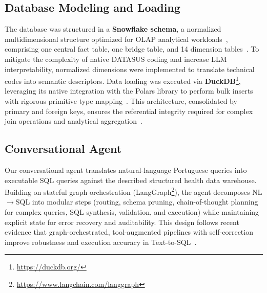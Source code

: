 \documentclass[conference]{IEEEtran}
\begin{document}
\subsection{Database Modeling and Loading}

The database was structured in a \textbf{Snowflake schema}, a normalized multidimensional structure optimized for OLAP  analytical workloads~\cite{raasveldt2020data}, comprising
one central fact table, one bridge table, and 14 dimension tables~\cite{kimball2013data}. To mitigate the complexity of native DATASUS coding and increase LLM interpretability, normalized dimensions were implemented to translate technical codes into semantic descriptors. Data loading was executed via \textbf{DuckDB}\footnote{\url{https://duckdb.org/}}, leveraging its native integration with the Polars library to perform bulk inserts with rigorous primitive type mapping~\cite{raasveldt2020data}. This architecture, consolidated by primary and foreign keys, ensures the referential integrity required for complex join operations and analytical aggregation~\cite{dama2017}.


\subsection{Conversational Agent}

Our conversational agent translates natural-language Portuguese queries into executable SQL queries against the described structured health data warehouse. Building on stateful graph orchestration (LangGraph\footnote{\url{https://www.langchain.com/langgraph}}), the agent decomposes NL$\rightarrow$SQL into modular steps (routing, schema pruning, chain-of-thought planning for complex queries, SQL synthesis, validation, and execution) while maintaining explicit state for error recovery and auditability. This design follows recent evidence that graph-orchestrated, tool-augmented pipelines with self-correction improve robustness and execution accuracy in Text-to-SQL~\cite{react2023,reflexion2023}.
\end{document}
